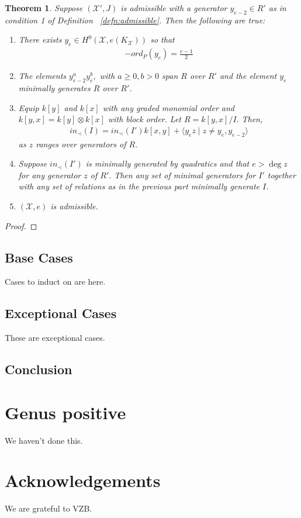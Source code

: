 \documentclass{amsart}
\theoremstyle{plain}
\newtheorem{thm}{Theorem}[section]
\theoremstyle{definition}
\theoremstyle{remark}
\numberwithin{equation}{section}
\newcommand\ssec{\subsection}
\newcommand \sx{\mathscr X}
\begin{document}
\begin{thm}
\label{thm:ramification_order_induction}
Suppose $(\sx',J)$ is admissible with a generator $y_{e-2} \in R'$ as in condition 1 of Definition ~\ref{defn:admissible}. Then the following are true:
\begin{enumerate}
	\item There exists $y_e \in H^0(\sx, e(K_\sx))$ so that 
	\begin{align*}
	-ord_P(y_e) = \frac{e-1}{2}
\end{align*}
\item The elements $y_{e-2}^ay_e^b,$ with $a \geq 0, b > 0$ span $R$ over $R'$ and the element $y_e$ minimally generates $R$ over $R'$.
\item Equip $k[y]$ and $k[x]$ with any graded monomial order and $k[y,x] = k[y] \otimes k[x]$ with block order. Let $R = k[y,x]/I.$ Then,
\begin{align*}
	in_\prec(I) = in_\prec(I')k[x,y] + \langle y_ez \mid z \neq y_e,y_{e-2} \rangle 
\end{align*}
	as $z$ ranges over generators of $R$.
	\item Suppose $in_\prec(I')$ is minimally generated by quadratics and that $e > \deg z$ for any generator $z$ of $R'.$ Then any set of minimal generators for $I'$ together with any set of relations as in the previous part  minimally generate $I$. 
	\item $(\sx,e)$ is admissible.
\end{enumerate}
\end{thm}
\begin{proof}

\end{proof}

\ssec{Base Cases}
\label{ssec:g_0_base}
Cases to induct on are here.

\ssec{Exceptional Cases}
\label{ssec:g_0_exceptional}
These are exceptional cases.

\ssec{Conclusion}
\label{ssec:g_0_conclusion}

\section{Genus positive}
We haven't done this.

\section{Acknowledgements}
We are grateful to VZB.

\nocite{*}
{}

\end{document}
